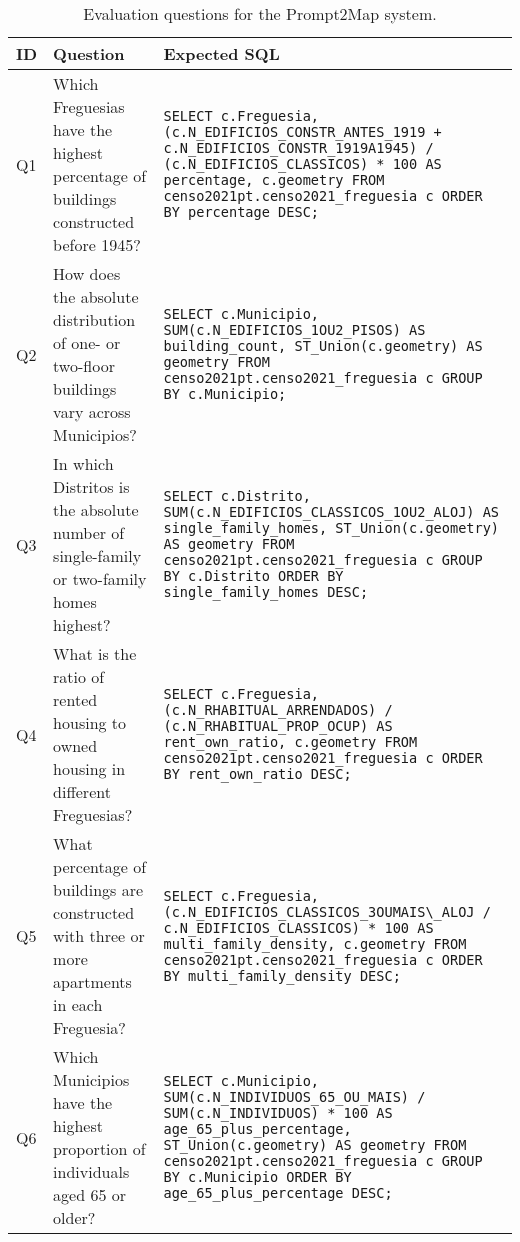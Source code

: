 {\bgroup
{}
\begin{xltabular}{\textwidth}{|p{0.05\textwidth}p{0.3\textwidth}p{0.55\textwidth}|}
    \caption{Evaluation questions for the Prompt2Map system.}
    \label{tab:evaluation_questions}\\
    \toprule
       ID & Question & Expected SQL \\
    \midrule
{}\label{question:1}Q1 & Which Freguesias have the highest percentage of buildings constructed before 1945? & \lstinline!SELECT c.Freguesia, (c.N_EDIFICIOS_CONSTR_ANTES_1919 + c.N_EDIFICIOS_CONSTR_1919A1945) / (c.N_EDIFICIOS_CLASSICOS) * 100 AS percentage, c.geometry FROM censo2021pt.censo2021_freguesia c ORDER BY percentage DESC;! \\
\label{question:2}Q2 & How does the absolute distribution of one- or two-floor buildings vary across Municipios? & \lstinline!SELECT c.Municipio, SUM(c.N_EDIFICIOS_1OU2_PISOS) AS building_count, ST_Union(c.geometry) AS geometry FROM censo2021pt.censo2021_freguesia c GROUP BY c.Municipio;! \\
\label{question:3}Q3 & In which Distritos is the absolute number of single-family or two-family homes highest? & \lstinline!SELECT c.Distrito, SUM(c.N_EDIFICIOS_CLASSICOS_1OU2_ALOJ) AS single_family_homes, ST_Union(c.geometry) AS geometry FROM censo2021pt.censo2021_freguesia c GROUP BY c.Distrito ORDER BY single_family_homes DESC;! \\
\label{question:4}Q4 & What is the ratio of rented housing to owned housing in different Freguesias? & \lstinline!SELECT c.Freguesia, (c.N_RHABITUAL_ARRENDADOS) / (c.N_RHABITUAL_PROP_OCUP) AS rent_own_ratio, c.geometry FROM censo2021pt.censo2021_freguesia c ORDER BY rent_own_ratio DESC;! \\
\label{question:5}Q5 & What percentage of buildings are constructed with three or more apartments in each Freguesia? & \lstinline!SELECT c.Freguesia, (c.N_EDIFICIOS_CLASSICOS_3OUMAIS\_ALOJ / c.N_EDIFICIOS_CLASSICOS) * 100 AS multi_family_density, c.geometry FROM censo2021pt.censo2021_freguesia c ORDER BY multi_family_density DESC;! \\
\label{question:6}Q6 & Which Municipios have the highest proportion of individuals aged 65 or older? & \lstinline!SELECT c.Municipio, SUM(c.N_INDIVIDUOS_65_OU_MAIS) / SUM(c.N_INDIVIDUOS) * 100 AS age_65_plus_percentage, ST_Union(c.geometry) AS geometry FROM censo2021pt.censo2021_freguesia c GROUP BY c.Municipio ORDER BY age_65_plus_percentage DESC;! \\

\end{xltabular}}
